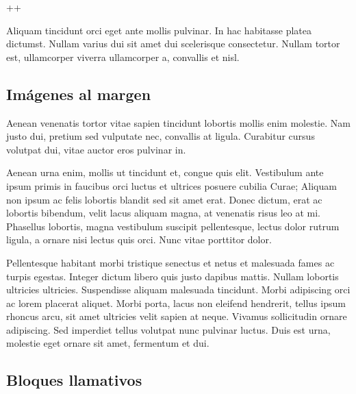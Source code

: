 
\begin{center}
++
\end{center}

Aliquam tincidunt orci eget ante mollis pulvinar. In hac habitasse platea dictumst. Nullam varius dui sit amet dui scelerisque consectetur. Nullam tortor est, ullamcorper viverra ullamcorper a, convallis et nisl.

\subsection{Imágenes al margen}

Aenean venenatis tortor vitae sapien tincidunt lobortis mollis enim molestie. Nam justo dui, pretium sed vulputate nec, convallis at ligula. Curabitur cursus volutpat dui, vitae auctor eros pulvinar in. 

Aenean urna enim, mollis ut tincidunt et, congue quis elit. Vestibulum ante ipsum primis in faucibus orci luctus et ultrices posuere cubilia Curae; Aliquam non ipsum ac felis lobortis blandit sed sit amet erat. Donec dictum, erat ac lobortis bibendum, velit lacus aliquam magna, at venenatis risus leo at mi. Phasellus lobortis, magna vestibulum suscipit pellentesque, lectus dolor rutrum ligula, a ornare nisi lectus quis orci. Nunc vitae porttitor dolor. 

Pellentesque habitant morbi tristique senectus et netus et malesuada fames ac turpis egestas. Integer dictum libero quis justo dapibus mattis. Nullam lobortis ultricies ultricies. Suspendisse aliquam malesuada tincidunt. Morbi adipiscing orci ac lorem placerat aliquet. Morbi porta, lacus non eleifend hendrerit, tellus ipsum rhoncus arcu, sit amet ultricies velit sapien at neque. Vivamus sollicitudin ornare adipiscing. Sed imperdiet tellus volutpat nunc pulvinar luctus. Duis est urna, molestie eget ornare sit amet, fermentum et dui. 

\subsection{Bloques llamativos}


